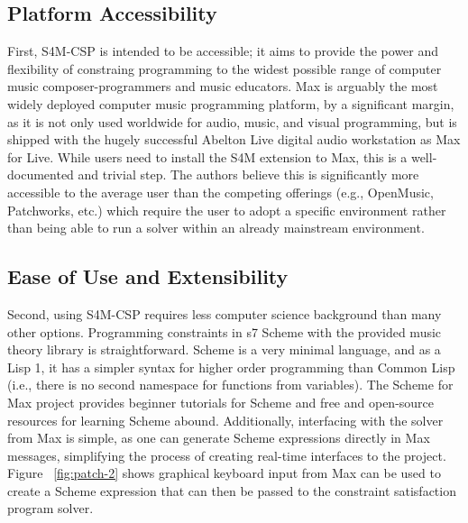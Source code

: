 \documentclass[pmlr]{jmlr}%
\begin{document}
\subsection{Platform Accessibility}
First, S4M-CSP is intended to be accessible; it aims to provide the power and flexibility of
constraing programming to the widest possible range of computer music composer-programmers and
music educators. Max is arguably the most widely deployed computer music programming platform, 
by a significant margin, as it is not only used worldwide for audio, music, and visual
programming, but is shipped with the hugely successful Abelton Live digital audio workstation
as Max for Live. While users need to install the S4M extension to Max, this is a well-documented
and trivial step. The authors believe this is significantly more accessible to the average user
than the competing offerings (e.g., OpenMusic, Patchworks, etc.) which require the user to 
adopt a specific environment rather than being able to run a solver within an already mainstream
environment.

\subsection{Ease of Use and Extensibility}
Second, using S4M-CSP requires less computer science background than many other options. 
Programming constraints in s7 Scheme with the provided music theory library is straightforward.
Scheme is a very minimal language, and as a Lisp 1, it has a simpler syntax for higher order 
programming than Common Lisp (i.e., there is no second namespace for functions from variables).
The Scheme for Max project provides beginner tutorials for Scheme and free and open-source
resources for learning Scheme abound. Additionally, interfacing with the solver from Max
is simple, as one can generate Scheme expressions directly in Max messages, simplifying the 
process of creating real-time interfaces to the project. Figure ~\ref{fig:patch-2} shows graphical keyboard input from Max can be used to create a Scheme expression that can then be passed to the constraint satisfaction program solver. 


\end{document}
